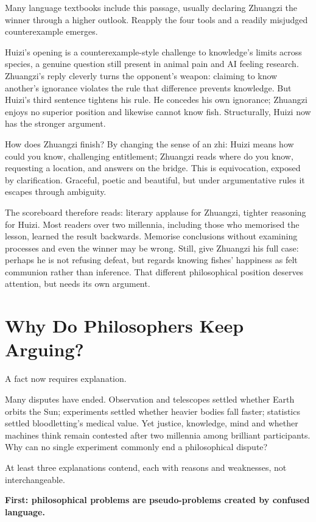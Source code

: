 Many language textbooks include this passage, usually declaring Zhuangzi the winner through a higher outlook. Reapply the four tools and a readily misjudged counterexample emerges.

Huizi's opening is a counterexample-style challenge to knowledge's limits across species, a genuine question still present in animal pain and AI feeling research. Zhuangzi's reply cleverly turns the opponent's weapon: claiming to know another's ignorance violates the rule that difference prevents knowledge. But Huizi's third sentence tightens his rule. He concedes his own ignorance; Zhuangzi enjoys no superior position and likewise cannot know fish. Structurally, Huizi now has the stronger argument.

How does Zhuangzi finish? By changing the sense of an zhi: Huizi means how could you know, challenging entitlement; Zhuangzi reads where do you know, requesting a location, and answers on the bridge. This is equivocation, exposed by clarification. Graceful, poetic and beautiful, but under argumentative rules it escapes through ambiguity.

The scoreboard therefore reads: literary applause for Zhuangzi, tighter reasoning for Huizi. Most readers over two millennia, including those who memorised the lesson, learned the result backwards. Memorise conclusions without examining processes and even the winner may be wrong. Still, give Zhuangzi his full case: perhaps he is not refusing defeat, but regards knowing fishes' happiness as felt communion rather than inference. That different philosophical position deserves attention, but needs its own argument.

\section{Why Do Philosophers Keep Arguing?}
A fact now requires explanation.

Many disputes have ended. Observation and telescopes settled whether Earth orbits the Sun; experiments settled whether heavier bodies fall faster; statistics settled bloodletting's medical value. Yet justice, knowledge, mind and whether machines think remain contested after two millennia among brilliant participants. Why can no single experiment commonly end a philosophical dispute?

At least three explanations contend, each with reasons and weaknesses, not interchangeable.

\textbf{First: philosophical problems are pseudo-problems created by confused language.}

